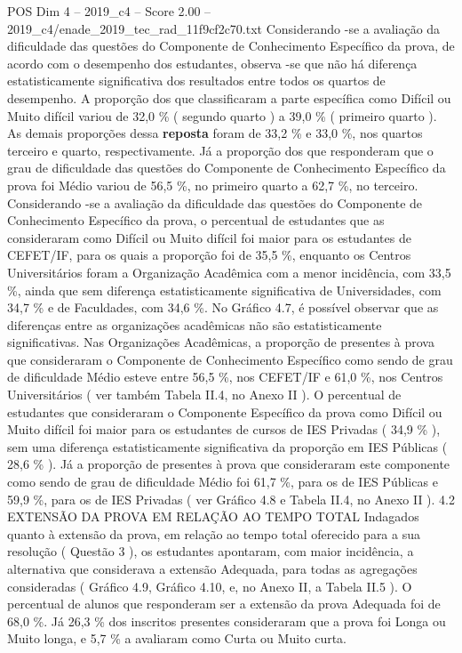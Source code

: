 \begin{textsample}{POS Dim 4 – 2019\_c4 – Score 2.00 – 2019\_c4/enade\_2019\_tec\_rad\_11f9cf2c70.txt}
Considerando -se a avaliação da dificuldade das questões do Componente de Conhecimento Específico da prova, de acordo com o desempenho dos estudantes, observa -se que não há diferença estatisticamente significativa dos resultados entre todos os quartos de desempenho.
A proporção dos que classificaram a parte específica como Difícil ou Muito difícil variou de 32,0 \% ( segundo quarto ) a 39,0 \% ( primeiro quarto ).
As demais proporções dessa \textbf{reposta} foram de 33,2 \% e 33,0 \%, nos quartos terceiro e quarto, respectivamente.
Já a proporção dos que responderam que o grau de dificuldade das questões do Componente de Conhecimento Específico da prova foi Médio variou de 56,5 \%, no primeiro quarto a 62,7 \%, no terceiro.
Considerando -se a avaliação da dificuldade das questões do Componente de Conhecimento Específico da prova, o percentual de estudantes que as consideraram como Difícil ou Muito difícil foi maior para os estudantes de CEFET/IF, para os quais a proporção foi de 35,5 \%, enquanto os Centros Universitários foram a Organização Acadêmica com a menor incidência, com 33,5 \%, ainda que sem diferença estatisticamente significativa de Universidades, com 34,7 \% e de Faculdades, com 34,6 \%.
No Gráfico 4.7, é possível observar que as diferenças entre as organizações acadêmicas não são estatisticamente significativas.
Nas Organizações Acadêmicas, a proporção de presentes à prova que consideraram o Componente de Conhecimento Específico como sendo de grau de dificuldade Médio esteve entre 56,5 \%, nos CEFET/IF e 61,0 \%, nos Centros Universitários ( ver também Tabela II.4, no Anexo II ).
O percentual de estudantes que consideraram o Componente Específico da prova como Difícil ou Muito difícil foi maior para os estudantes de cursos de IES Privadas ( 34,9 \% ), sem uma diferença estatisticamente significativa da proporção em IES Públicas ( 28,6 \% ).
Já a proporção de presentes à prova que consideraram este componente como sendo de grau de dificuldade Médio foi 61,7 \%, para os de IES Públicas e 59,9 \%, para os de IES Privadas ( ver Gráfico 4.8 e Tabela II.4, no Anexo II ). 4.2 EXTENSÃO DA PROVA EM RELAÇÃO AO TEMPO TOTAL Indagados quanto à extensão da prova, em relação ao tempo total oferecido para a sua resolução ( Questão 3 ), os estudantes apontaram, com maior incidência, a alternativa que considerava a extensão Adequada, para todas as agregações consideradas ( Gráfico 4.9, Gráfico 4.10, e, no Anexo II, a Tabela II.5 ).
O percentual de alunos que responderam ser a extensão da prova Adequada foi de 68,0 \%.
Já 26,3 \% dos inscritos presentes consideraram que a prova foi Longa ou Muito longa, e 5,7 \% a avaliaram como Curta ou Muito curta.

\end{textsample}
